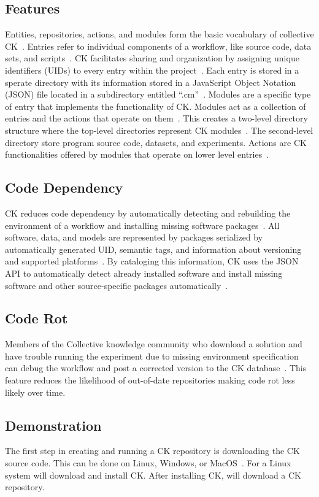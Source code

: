 \documentclass{IEEEtran}
\begin{document}
\subsection{Features}
Entities, repositories, actions, and modules form the basic vocabulary of collective CK~\cite{CKTS}. Entries refer to individual components of a workflow, like source code, data sets, and scripts~\cite{aboutCK}. CK facilitates sharing and organization by assigning unique identifiers (UIDs) to every entry within the project~\cite{aboutCK}. Each entry is stored in a sperate directory with its information stored in a JavaScript Object Notation (JSON) file located in a subdirectory entitled “.cm”~\cite{ctuning/ck}. Modules are a specific type of entry that implements the functionality of CK. Modules act as a collection of entries and the actions that operate on them~\cite{aboutCK}. This creates a two-level directory structure where the top-level directories represent CK modules~\cite{aboutCK}. The second-level directory store program source code, datasets, and experiments. Actions are CK functionalities offered by modules that operate on lower level entries~\cite{aboutCK}. 

\subsection{Code Dependency}
CK reduces code dependency by automatically detecting and rebuilding the environment of a workflow and installing missing software packages~\cite{ctuning/feat}. All software, data, and models are represented by packages serialized by automatically generated UID, semantic tags, and information about versioning and supported platforms~\cite{ctuning/feat}. By cataloging this information, CK uses the JSON API to automatically detect already installed software and install missing software and other source-specific packages automatically~\cite{ctuningPW}. 

\subsection{Code Rot}
Members of the Collective knowledge community who download a solution and have trouble running the experiment due to missing environment specification can debug the workflow and post a corrected version to the CK database~\cite{aboutCK}. This feature reduces the likelihood of out-of-date repositories making code rot less likely over time. 

\subsection{Demonstration}
The first step in creating and running a CK repository is downloading the CK source code. This can be done on Linux, Windows, or MacOS~\cite{DPCK}. For a Linux system  will download and install CK.
After installing CK,  will download a CK repository.
\end{document}
